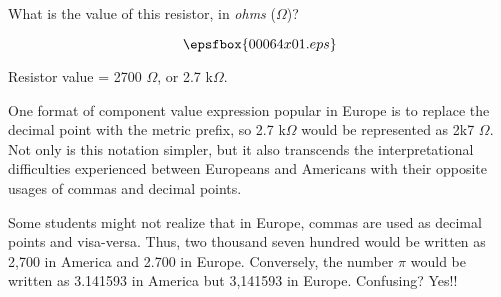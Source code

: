 

What is the value of this resistor, in {\it ohms} ($\Omega$)?

$$\epsfbox{00064x01.eps}$$







Resistor value = 2700 $\Omega$, or 2.7 k$\Omega$.  

One format of component value expression popular in Europe is to replace the decimal point with the metric prefix, so 2.7 k$\Omega$ would be represented as 2k7 $\Omega$.  Not only is this notation simpler, but it also transcends the interpretational difficulties experienced between Europeans and Americans with their opposite usages of commas and decimal points.







Some students might not realize that in Europe, commas are used as decimal points and visa-versa.  Thus, two thousand seven hundred would be written as 2,700 in America and 2.700 in Europe.  Conversely, the number $\pi$ would be written as 3.141593 in America but 3,141593 in Europe.  Confusing?  Yes!!




